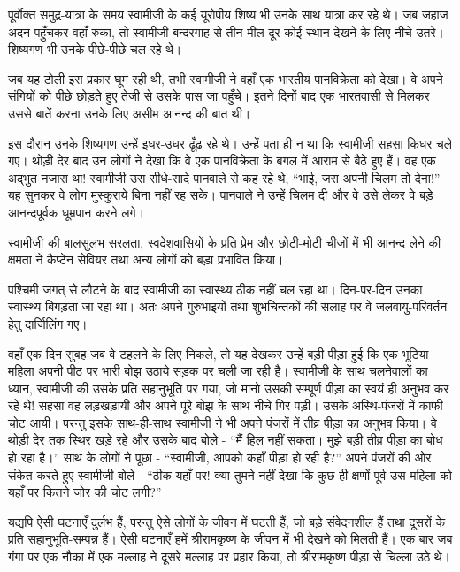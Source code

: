 \vskip -6pt

\delimiter

पूर्वोक्त समुद्र-यात्रा के समय स्वामीजी के कई यूरोपीय शिष्य भी उनके साथ यात्रा कर रहे थे। जब जहाज अदन पहुँचकर वहाँ रुका, तो स्वामीजी बन्दरगाह से तीन मील दूर कोई स्थान देखने के लिए नीचे उतरे। शिष्यगण भी उनके पीछे-पीछे चल रहे थे। 

जब यह टोली इस प्रकार घूम रही थी, तभी स्वामीजी ने वहाँ एक भारतीय पानविक्रेता को देखा। वे अपने संगियों को पीछे छोड़ते हुए तेजी से उसके पास जा पहुँचे। इतने दिनों बाद एक भारतवासी से मिलकर उससे बातें करना उनके लिए असीम आनन्द की बात थी। 

इस दौरान उनके शिष्यगण उन्हें इधर-उधर ढूँढ़ रहे थे। उन्हें पता ही न था कि स्वामीजी सहसा किधर चले गए। थोड़ी देर बाद उन लोगों ने देखा कि वे एक पानविक्रेता के बगल में आराम से बैठे हुए हैं। वह एक अद्भुत नजारा था! स्वामीजी उस सीधे-सादे पानवाले से कह रहे थे, “भाई, जरा अपनी चिलम तो देना!” यह सुनकर वे लोग मुस्कुराये बिना नहीं रह सके। पानवाले ने उन्हें चिलम दी और वे उसे लेकर वे बड़े आनन्दपूर्वक धूम्रपान करने लगे। 

स्वामीजी की बालसुलभ सरलता, स्वदेशवासियों के प्रति प्रेम और छोटी-मोटी चीजों में भी आनन्द लेने की क्षमता ने कैप्टेन सेवियर तथा अन्य लोगों को बड़ा प्रभावित किया। 

\delimiter

पश्चिमी जगत् से लौटने के बाद स्वामीजी का स्वास्थ्य ठीक नहीं चल रहा था। दिन-पर-दिन उनका स्वास्थ्य बिगड़ता जा रहा था। अतः अपने गुरुभाइयों तथा शुभचिन्तकों की सलाह पर वे जलवायु-परिवर्तन हेतु दार्जिलिंग गए। 

वहाँ एक दिन सुबह जब वे टहलने के लिए निकले, तो यह देखकर उन्हें बड़ी पीड़ा हुई कि एक भूटिया महिला अपनी पीठ पर भारी बोझ उठाये सड़क पर चली जा रही है। स्वामीजी के साथ चलनेवालों का ध्यान, स्वामीजी की उसके प्रति सहानुभूति पर गया, जो मानो उसकी सम्पूर्ण पीड़ा का स्वयं ही अनुभव कर रहे थे! सहसा वह लड़खड़ायी और अपने पूरे बोझ के साथ नीचे गिर पड़ी। उसके अस्थि-पंजरों में काफी चोट आयी। परन्तु इसके साथ-ही-साथ स्वामीजी ने भी अपने पंजरों में तीव्र पीड़ा का अनुभव किया। वे थोड़ी देर तक स्थिर खड़े रहे और उसके बाद बोले - “मैं हिल नहीं सकता। मुझे बड़ी तीव्र पीड़ा का बोध हो रहा है।” साथ के लोगों ने पूछा - “स्वामीजी, आपको कहाँ पीड़ा हो रही है?” अपने पंजरों की ओर संकेत करते हुए स्वामीजी बोले - “ठीक यहाँ पर! क्या तुमने नहीं देखा कि कुछ ही क्षणों पूर्व उस महिला को यहाँ पर कितने जोर की चोट लगी?” 

यद्यपि ऐसी घटनाएँ दुर्लभ हैं, परन्तु ऐसे लोगों के जीवन में घटती हैं, जो बड़े संवेदनशील हैं तथा दूसरों के प्रति सहानुभूति-सम्पन्न हैं। ऐसी घटनाएँ हमें श्रीरामकृष्ण के जीवन में भी देखने को मिलती हैं। एक बार जब गंगा पर एक नौका में एक मल्लाह ने दूसरे मल्लाह पर प्रहार किया, तो श्रीरामकृष्ण पीड़ा से चिल्ला उठे थे। 

